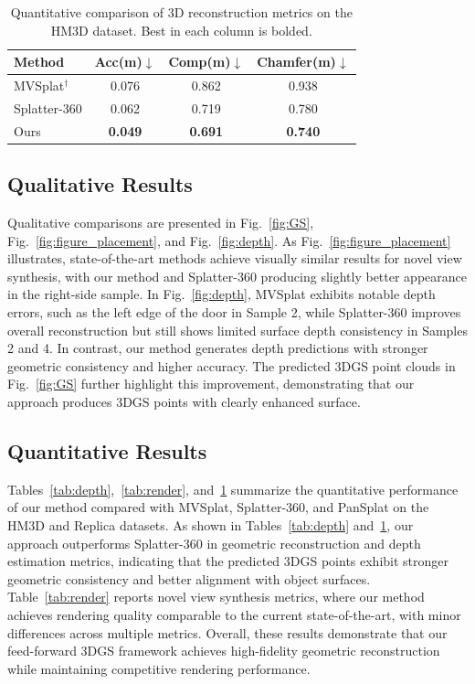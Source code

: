 \renewcommand{\arraystretch}{0.70}
\setlength{\tabcolsep}{10pt}
\begin{table}[!t]
  \centering
  \scriptsize  \captionsetup{justification=raggedright,singlelinecheck=false}
    \caption{Quantitative comparison of 3D reconstruction metrics on the HM3D dataset. Best in each column is bolded.}
  \label{tab:reconstruction}  
  \begin{tabular}{lccc}
    \toprule
    Method & Acc(m)$\downarrow$ & Comp(m)$\downarrow$ & Chamfer(m)$\downarrow$ \\
    \midrule
    MVSplat$^\dagger$  & 0.076 & 0.862 & 0.938 \\
    Splatter-360  & 0.062 & 0.719 & 0.780 \\
     Ours & \textbf{0.049} & \textbf{0.691} & \textbf{0.740} \\
    \bottomrule
  \end{tabular}
\end{table}

\subsection{Qualitative Results}\label{subsec:qualitative}Qualitative comparisons are presented in Fig.~\ref{fig:GS}, Fig.~\ref{fig:figure_placement}, and Fig.~\ref{fig:depth}. As Fig.~\ref{fig:figure_placement} illustrates, state-of-the-art methods achieve visually similar results for novel view synthesis, with our method and Splatter-360 producing slightly better appearance in the right-side sample. In Fig.~\ref{fig:depth}, MVSplat exhibits notable depth errors, such as the left edge of the door in Sample 2, while Splatter-360 improves overall reconstruction but still shows limited surface depth consistency in Samples 2 and 4. In contrast, our method generates depth predictions with stronger geometric consistency and higher accuracy. The predicted 3DGS point clouds in Fig.~\ref{fig:GS} further highlight this improvement, demonstrating that our approach produces 3DGS points with clearly enhanced surface.

\subsection{Quantitative Results}\label{subsec:quantitative}

Tables~\ref{tab:depth},~\ref{tab:render}, and~\ref{tab:reconstruction} summarize the quantitative performance of our method compared with MVSplat, Splatter-360, and PanSplat on the HM3D and Replica datasets. As shown in Tables~\ref{tab:depth} and~\ref{tab:reconstruction}, our approach outperforms Splatter-360 in geometric reconstruction and depth estimation metrics, indicating that the predicted 3DGS points exhibit stronger geometric consistency and better alignment with object surfaces. Table~\ref{tab:render} reports novel view synthesis metrics, where our method achieves rendering quality comparable to the current state-of-the-art, with minor differences across multiple metrics. Overall, these results demonstrate that our feed-forward 3DGS framework achieves high-fidelity geometric reconstruction while maintaining competitive rendering performance.

